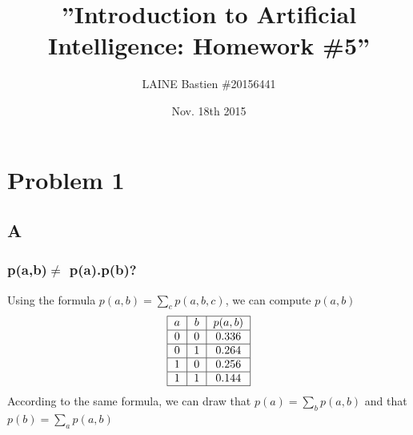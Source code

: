 \documentclass{article}
\begin{document}
\title{\textbf{''Introduction to Artificial Intelligence: Homework \#5''}}
\author{LAINE Bastien \#20156441}
\date{Nov. 18th 2015}
\maketitle
\tableofcontents

\newpage
    \section{Problem 1}
        \subsection{A}
            \subsubsection{p(a,b)$\ne$ p(a).p(b)?}
                Using the formula $p(a, b)=\sum_c p(a, b, c)$, we can compute $p(a, b)$
                \[
                    \begin{tabular}{|c|c|c|}
                        \hline
                        $a$&$b$&$p(a,b)$\\
                        \hline
                        0&0&0.336\\
                        \hline
                        0&1&0.264\\
                        \hline
                        1&0&0.256\\
                        \hline
                        1&1&0.144\\
                        \hline
                    \end{tabular}
                \]
                According to the same formula, we can draw that $p(a)=\sum_b p(a,b)$ and that $p(b)=\sum_a p(a,b)$
\end{document}
